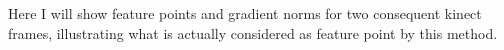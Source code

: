 Here I will show feature points and gradient norms for two consequent kinect frames, illustrating what is actually considered as feature point by this method. 